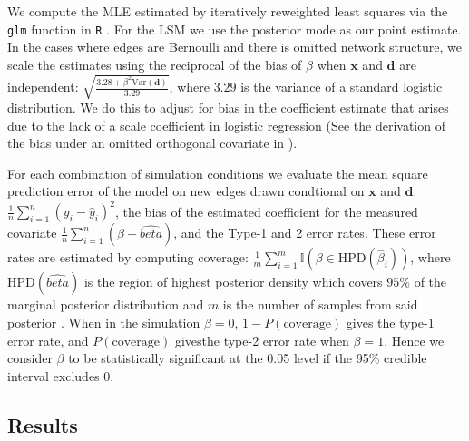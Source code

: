 \documentclass[11pt]{article}
\begin{document}
We compute the MLE estimated by iteratively reweighted least squares
via the \texttt{glm} function in \texttt{R} \citep{rcore}. For the LSM
we use the posterior mode as our point estimate. In the cases where
edges are Bernoulli and there is omitted network structure, we scale
the estimates using the reciprocal of the bias of $\beta$ when
$\mathbf{x}$ and $\mathbf{d}$ are independent: $\sqrt{\frac{3.28 +
    \beta^2 \text{Var}(\mathbf{d})}{3.29}}$, where $3.29$ is the
variance of a standard logistic distribution. We do this to adjust for
bias in the coefficient estimate that arises due to the lack of a
scale coefficient in logistic regression (See the derivation of the
bias under an omitted orthogonal covariate in
\cite{mood2010logistic}).

For each combination of simulation conditions we evaluate the mean
square prediction error of the model on new edges drawn condtional on
$\mathbf{x}$ and $\mathbf{d}$: $\frac{1}{n}\sum_{i=1}^{n}(y_{i} - \hat{y}_i)^2$, the bias of the estimated coefficient
for the measured covariate $\frac{1}{n} \sum_{i=1}^n (\beta - \hat{beta})$, and the Type-1 and 2 error
rates. These error rates are estimated by computing coverage: $\frac{1}{m} \sum_{i=1}^m\mathbb{I}(\beta \in \text{HPD}(\hat{\beta}_i))$, where $\text{HPD}(\hat{beta})$ is the region of highest posterior density which covers $95\%$ of the marginal posterior distribution and $m$ is the number of samples from said posterior \cite{turkkan1993computation}. When in the simulation $\beta = 0$, $1 - P(\text{coverage})$ gives the type-1 error rate, and $P(\text{coverage})$ givesthe type-2 error rate when $\beta = 1$. Hence we consider $\beta$ to be statistically
significant at the 0.05 level if the 95\% credible interval excludes 0. 

\subsection{Results}
\end{document}
